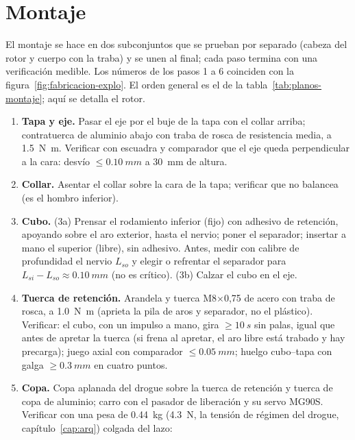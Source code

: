 \section{Montaje}\label{sec:fabricacion-montaje}

El montaje se hace en dos subconjuntos que se prueban por separado (cabeza del rotor y
cuerpo con la traba) y se unen al final; cada paso termina con una verificación medible.
Los números de los pasos 1 a 6 coinciden con la figura~\ref{fig:fabricacion-explo}. El
orden general es el de la tabla~\ref{tab:planos-montaje}; aquí se detalla el rotor.

\begin{enumerate}[leftmargin=*, label=\textbf{\arabic*.}]
  \item \textbf{Tapa y eje.} Pasar el eje por el buje de la tapa con el collar arriba;
        contratuerca de aluminio abajo con traba de rosca de resistencia media, a
        \SI{1.5}{N.m}. Verificar con escuadra y comparador que el eje queda perpendicular a
        la cara: desvío $\le\SI{0.10}{mm}$ a \SI{30}{mm} de altura.
  \item \textbf{Collar.} Asentar el collar sobre la cara de la tapa; verificar que no
        balancea (es el hombro inferior).
  \item \textbf{Cubo.} (3a) Prensar el rodamiento inferior (fijo) con adhesivo de
        retención, apoyando sobre el aro exterior, hasta el nervio; poner el separador;
        insertar a mano el superior (libre), sin adhesivo. Antes, medir con calibre de
        profundidad el nervio $L_{so}$ y elegir o refrentar el separador para
        $L_{si}-L_{so}\approx\SI{0.10}{mm}$ (no es crítico). (3b) Calzar el cubo en el eje.
  \item \textbf{Tuerca de retención.} Arandela y tuerca M8$\times$0,75 de acero con traba
        de rosca, a \SI{1.0}{N.m} (aprieta la pila de aros y separador, no el plástico).
        Verificar: el cubo, con un impulso a mano, gira $\ge\SI{10}{s}$ sin palas, igual
        que antes de apretar la tuerca (si frena al apretar, el aro libre está trabado y hay
        precarga); juego axial con comparador $\le\SI{0.05}{mm}$; huelgo cubo--tapa con
        galga $\ge\SI{0.3}{mm}$ en cuatro puntos.
  \item \textbf{Copa.} Copa aplanada del drogue sobre la tuerca de retención y tuerca de copa de
        aluminio; carro con el pasador de liberación y su servo MG90S. Verificar con una pesa de
        \SI{0.44}{kg} (\SI{4.3}{N}, la tensión de régimen del drogue, capítulo~\ref{cap:arq}) colgada del lazo:

\end{enumerate}

